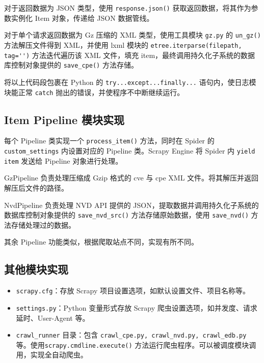 \documentclass[a4paper,AutoFakeBold,oneside,12pt]{book}
\begin{document}
对于返回数据为 JSON 类型，使用 \lstinline[style = python]|response.json()| 获取返回数据，将其作为参数实例化 Item 对象，传递给 JSON 数据管线。

对于单个请求返回数据为 Gz 压缩的 XML 类型，使用工具模块 \lstinline[style = python]|gz.py| 的 \lstinline[style = python]|un_gz()| 方法解压文件得到 XML，并使用 lxml 模块的 \lstinline[style = python]|etree.iterparse(filepath, tag='')| 方法迭代遍历该 XML 文件，填充 item，最终调用持久化子系统的数据库控制对象提供的 \lstinline[style = python]|save_cpe()| 方法存储。

将以上代码段包裹在 Python 的 \lstinline|try...except...finally...| 语句内，使日志模块能正常 \lstinline|catch| 抛出的错误，并使程序不中断继续运行。

\subsection{Item Pipeline 模块实现}

每个 Pipeline 类实现一个 \lstinline[style = python]|process_item()| 方法，同时在 Spider 的 \lstinline[style = python]|custom_settings| 内设置对应的 Pipeline 类。Scrapy Engine 将 Spider 内 \lstinline[style = python]|yield item| 发送给 Pipeline 对象进行处理。

GzPipeline 负责处理压缩成 Gzip 格式的 cve 与 cpe XML 文件。将其解压并返回解压后文件的路径。

NvdPipeline 负责处理 NVD API 提供的 JSON，提取数据并调用持久化子系统的数据库控制对象提供的 \lstinline|save_nvd_src()| 方法存储原始数据，使用 \lstinline|save_nvd()| 方法存储处理过的数据。

其余 Pipeline 功能类似，根据爬取站点不同，实现有所不同。

\subsection{其他模块实现}

\begin{itemize}
	\item \lstinline|scrapy.cfg|：存放 Scrapy 项目设置选项，如默认设置文件、项目名称等。
	\item \lstinline|settings.py|：Python 变量形式存放 Scrapy 爬虫设置选项，如并发度、请求延时、User-Agent 等。
	\item \lstinline|crawl_runner| 目录：包含 \lstinline|crawl_cpe.py, crawl_nvd.py, crawl_edb.py| 等。使用\linebreak \lstinline|scrapy.cmdline.execute()| 方法运行爬虫程序。可以被调度模块调用，实现全自动爬虫。
\end{itemize}
\end{document}
